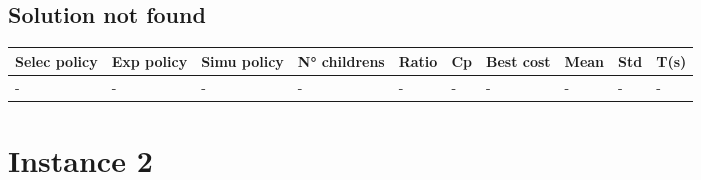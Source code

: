 \subsection{Solution not found}
\begin{center}
  \small
  \begin{longtable}{||>{\centering\arraybackslash}p{1.3cm}
    >{\centering\arraybackslash}p{1.3cm}
    >{\centering\arraybackslash}p{1.3cm}
    >{\centering\arraybackslash}p{1.3cm}
    >{\centering\arraybackslash}p{0.7cm}
    >{\centering\arraybackslash}p{0.8cm}
    >{\centering\arraybackslash}p{1cm}
    >{\centering\arraybackslash}p{1cm}
    >{\centering\arraybackslash}p{1cm}
    >{\centering\arraybackslash}p{1cm}
    ||}
    \toprule
    Selec policy & Exp policy & Simu policy & N° childrens & Ratio & Cp & Best cost & Mean & Std & T(s) \\
    \midrule
    -            & -          & -           & -            & -     & -  & -         & -    & -   & -    \\
    \bottomrule
  \end{longtable}
\end{center}


\section*{Instance 2}
